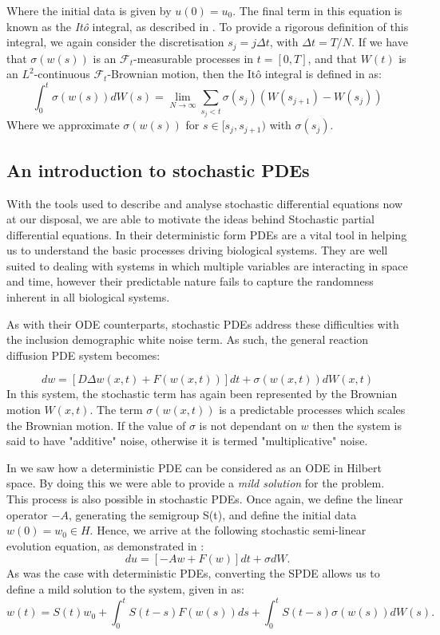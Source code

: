 \documentclass[12pt]{article}
\begin{document}
Where the initial data is given by $u(0) = u_0$. The final term in this equation is known as the \textit{It\^{o}} integral, as described in \cite{Ito}. To provide a rigorous definition of this integral, we again consider the discretisation $s_j = j\Delta t$, with $\Delta t = T/N$. If we have that $\sigma(w(s))$ is an $\mathcal{F}_t$-measurable processes in $t = [0,T]$, and that $W(t)$ is an $L^2$-continuous $\mathcal{F}_t$-Brownian motion, then the It\^{o} integral is defined in \cite{Lord} as:
\begin{equation}\label{ItoInt}
\int_0^t \sigma(w(s)) d W(s) = \lim_{N\to\infty}\sum_{s_j<t}\sigma(s_j)(W(s_{j+1}) - W(s_j))
\end{equation}
Where we approximate $\sigma(w(s))$ for $s \in [s_j, s_{j+1})$ with $\sigma(s_j)$.
\subsection{An introduction to stochastic PDEs}
With the tools used to describe and analyse stochastic differential equations now at our disposal, we are able to motivate the ideas behind Stochastic partial differential equations. In their deterministic form PDEs are a vital tool in helping us to understand the basic processes driving biological systems. They are well suited to dealing with systems in which multiple variables are interacting in space and time, however their predictable nature fails to capture the randomness inherent in all biological systems.

As with their ODE counterparts, stochastic PDEs address these difficulties with the inclusion demographic white noise term. As such, the general reaction diffusion PDE system becomes:

  \begin{equation} \label{SRDS}
  d w = \left[D\Delta w(x,t) + F(w(x,t))\right]d t + \sigma(w(x,t))d W(x,t)
  \end{equation}
In this system, the stochastic term has again been represented by the Brownian motion $W(x,t)$. The term $\sigma(w(x,t))$ is a predictable processes which scales the Brownian motion. If the value of $\sigma$ is not dependant on $w$ then the system is said to have "additive" noise, otherwise it is termed "multiplicative" noise. 

In  we saw how a deterministic PDE can be considered as an ODE in Hilbert space. By doing this we were able to provide a \textit{mild solution} for the problem. This process is also possible in stochastic PDEs. Once again, we define the linear operator $-A$, generating the semigroup S(t), and define the initial data $w(0) = w_0 \in H$. Hence, we arrive at the following stochastic semi-linear evolution equation, as demonstrated in \cite{Lord}:
\begin{equation}\label{SODEonH}
du = \left[-Aw + F(w)\right]dt + \sigma dW.
\end{equation}
As was the case with deterministic PDEs, converting the SPDE allows us to define a mild solution to the system, given in \cite{Chow} as:
\begin{equation}\label{MildSODE}
w(t) = S(t)w_0 + \int_0^t S(t-s) F(w(s))ds + \int_0^tS(t-s)\sigma(w(s)) dW(s).
\end{equation}
\end{document}
